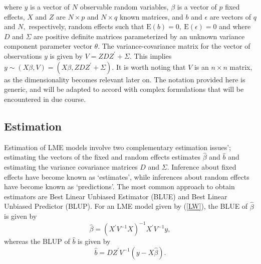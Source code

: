 \documentclass[12pt, a4paper]{report}
\theoremstyle{plain}
\theoremstyle{definition}
\theoremstyle{remark}
\begin{document}
	\noindent where $y$ is a vector of $N$ observable random variables, $\beta$ is a vector of $p$ fixed effects, $X$ and $Z$ are $N \times p$ and $N \times q$ known matrices, and $b$ and $\epsilon$  are vectors of $q$ and $N,$ respectively, random effects such that $\mathrm{E}(b)=0, \ \mathrm{E}(\epsilon)=0$
	and
	where $D$ and $\Sigma$ are positive definite matrices parameterized by an unknown variance component parameter vector $ \theta.$ The variance-covariance matrix for the vector of observations $y$ is given by $V = ZDZ^{\prime}+ \Sigma.$ This implies $y \sim(X\beta, V) = (X\beta,ZDZ^{\prime}+ \Sigma)$. It is worth noting that $V$ is an $n \times n$ matrix, as the dimensionality becomes relevant later on. The notation provided here is generic, and will be adapted to accord with complex formulations that will be encountered in due course.
	
	
	
	
	
	\subsection{Estimation}
	Estimation of LME models involve two complementary estimation issues'; estimating the vectors of the fixed and random effects estimates $\hat{\beta}$ and $\hat{b}$ and estimating the variance covariance matrices $D$ and $\Sigma$.
	Inference about fixed effects have become known as `estimates', while inferences about random effects have become known as `predictions'. The most common approach to obtain estimators are Best Linear Unbiased Estimator (BLUE) and Best Linear Unbiased Predictor (BLUP). For an LME model given by (\ref{LW}), the BLUE of $\hat{\beta}$ is given by
	\[\hat{\beta} = (X^\prime V^{-1}X)^{-1}X^\prime V^{-1}y,\]whereas the BLUP of $\hat{b}$ is given by
	\[\hat{b} = DZ^{\prime} V^{-1} (y-X\hat{\beta}).\]
	
\end{document}
